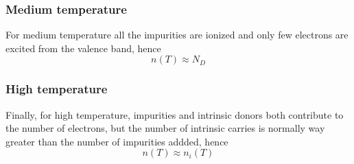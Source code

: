 \documentclass{article}
\begin{document}
\subsubsection*{Medium temperature}
For medium temperature all the impurities are ionized and only few electrons are excited from the valence band, hence 
\begin{equation*}
    n(T) \approx N_D
\end{equation*}
\subsubsection*{High temperature}
Finally, for high temperature, impurities and intrinsic donors both contribute to the number of electrons, but the number of intrinsic carries is normally way greater than 
the number of impurities addded, hence 
\begin{equation*}
    n(T) \approx n_i(T)
\end{equation*}
\end{document}
